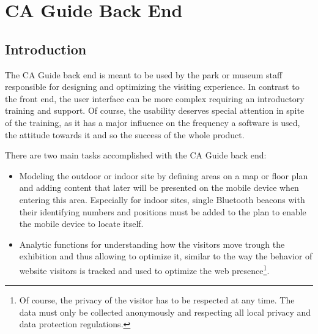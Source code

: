 
\chapter{CA Guide Back End} %

\label{backend} %



\section{Introduction}

The CA Guide back end is meant to be used by the park or museum staff responsible for designing and optimizing the visiting experience. In contrast to the front end, the user interface can be more complex requiring an introductory training and support. Of course, the usability deserves special attention in spite of the training, as it has a major influence on the frequency a software is used, the attitude towards it and so the success of the whole product. %

There are two main tasks accomplished with the CA Guide back end:

\begin{itemize}
\item Modeling the outdoor or indoor site by defining areas on a map or floor plan and adding content that later will be presented on the mobile device when entering this area. Especially for indoor sites, single Bluetooth beacons with their identifying numbers and positions must be added to the plan to enable the mobile device to locate itself.
\item Analytic functions for understanding how the visitors move trough the exhibition and thus allowing to optimize it, similar to the way the behavior of website visitors is tracked and used to optimize the web presence\footnote{Of course, the privacy of the visitor has to be respected at any time. The data must only be collected anonymously and respecting all local privacy and data protection regulations.}.
\end{itemize}


